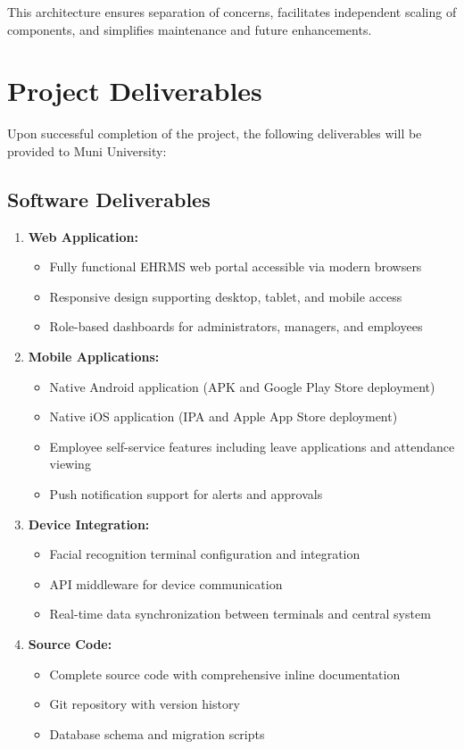 \documentclass[12pt]{article}
\begin{document}
This architecture ensures separation of concerns, facilitates independent scaling of components, and simplifies maintenance and future enhancements.

\section{Project Deliverables}

Upon successful completion of the project, the following deliverables will be provided to Muni University:

\subsection{Software Deliverables}

\begin{enumerate}
\item \textbf{Web Application:}
   \begin{itemize}[noitemsep]
   \item Fully functional EHRMS web portal accessible via modern browsers
   \item Responsive design supporting desktop, tablet, and mobile access
   \item Role-based dashboards for administrators, managers, and employees
   \end{itemize}

\item \textbf{Mobile Applications:}
   \begin{itemize}[noitemsep]
   \item Native Android application (APK and Google Play Store deployment)
   \item Native iOS application (IPA and Apple App Store deployment)
   \item Employee self-service features including leave applications and attendance viewing
   \item Push notification support for alerts and approvals
   \end{itemize}

\item \textbf{Device Integration:}
   \begin{itemize}[noitemsep]
   \item Facial recognition terminal configuration and integration
   \item API middleware for device communication
   \item Real-time data synchronization between terminals and central system
   \end{itemize}

\item \textbf{Source Code:}
   \begin{itemize}[noitemsep]
   \item Complete source code with comprehensive inline documentation
   \item Git repository with version history
   \item Database schema and migration scripts
   \end{itemize}
\end{enumerate}
\end{document}
